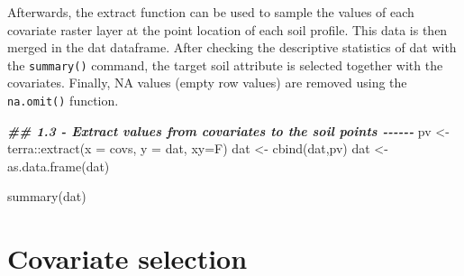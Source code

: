 \documentclass[
  10pt,
  b5paper,
  oneside]{book}
\newenvironment{Shaded}{\begin{snugshade}}{\end{snugshade}}
\newcommand{\AttributeTok}[1]{\textcolor[rgb]{0.77,0.63,0.00}{#1}}
\newcommand{\DocumentationTok}[1]{\textcolor[rgb]{0.56,0.35,0.01}{\textbf{\textit{#1}}}}
\newcommand{\FunctionTok}[1]{\textcolor[rgb]{0.00,0.00,0.00}{#1}}
\newcommand{\NormalTok}[1]{#1}
\newcommand{\OtherTok}[1]{\textcolor[rgb]{0.56,0.35,0.01}{#1}}
\newcommand{\SpecialCharTok}[1]{\textcolor[rgb]{0.00,0.00,0.00}{#1}}
\begin{document}
Afterwards, the extract function can be used to sample the values of each covariate raster layer at the point location of each soil profile. This data is then merged in the dat dataframe. After checking the descriptive statistics of dat with the \texttt{summary()} command, the target soil attribute is selected together with the covariates. Finally, NA values (empty row values) are removed using the \texttt{na.omit()} function.

\begin{Shaded}
\begin{Highlighting}[]
\DocumentationTok{\#\# 1.3 {-} Extract values from covariates to the soil points {-}{-}{-}{-}{-}{-}}
\NormalTok{pv }\OtherTok{\textless{}{-}}\NormalTok{ terra}\SpecialCharTok{::}\FunctionTok{extract}\NormalTok{(}\AttributeTok{x =}\NormalTok{ covs, }\AttributeTok{y =}\NormalTok{ dat, }\AttributeTok{xy=}\NormalTok{F)}
\NormalTok{dat }\OtherTok{\textless{}{-}} \FunctionTok{cbind}\NormalTok{(dat,pv)}
\NormalTok{dat }\OtherTok{\textless{}{-}} \FunctionTok{as.data.frame}\NormalTok{(dat)}

\FunctionTok{summary}\NormalTok{(dat)}
\end{Highlighting}
\end{Shaded}

\hypertarget{covariate-selection}{%
\section{Covariate selection}\label{covariate-selection}}
\end{document}
